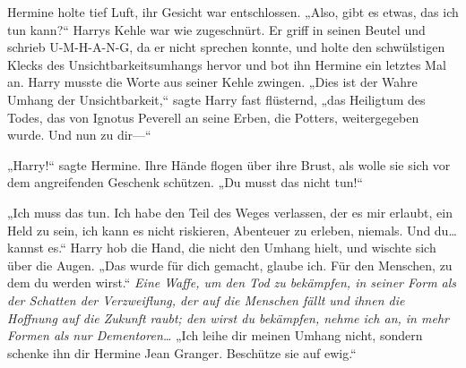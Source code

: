 Hermine holte tief Luft, ihr Gesicht war entschlossen.
„Also, gibt es etwas, das ich tun kann?“
Harrys Kehle war wie zugeschnürt. Er griff in seinen Beutel und schrieb U-M-H-A-N-G, da er nicht sprechen konnte, und holte den schwülstigen Klecks des Unsichtbarkeitsumhangs hervor und bot ihn Hermine ein letztes Mal an. Harry musste die Worte aus seiner Kehle zwingen.
„Dies ist der Wahre Umhang der Unsichtbarkeit,“ sagte Harry fast flüsternd, „das Heiligtum des Todes, das von Ignotus Peverell an seine Erben, die Potters, weitergegeben wurde. Und nun zu dir—“

„Harry!“ sagte Hermine. Ihre Hände flogen über ihre Brust, als wolle sie sich vor dem angreifenden Geschenk schützen.
„Du musst das nicht tun!“

„Ich muss das tun. Ich habe den Teil des Weges verlassen, der es mir erlaubt, ein Held zu sein, ich kann es nicht riskieren, Abenteuer zu erleben, niemals. Und du…kannst es.“ Harry hob die Hand, die nicht den Umhang hielt, und wischte sich über die Augen. „Das wurde für dich gemacht, glaube ich. Für den Menschen, zu dem du werden wirst.“
\emph{Eine Waffe, um den Tod zu bekämpfen, in seiner Form als der Schatten der Verzweiflung, der auf die Menschen fällt und ihnen die Hoffnung auf die Zukunft raubt; den wirst du bekämpfen, nehme ich an, in mehr Formen als nur Dementoren…}
„Ich leihe dir meinen Umhang nicht, sondern schenke ihn dir Hermine Jean Granger. Beschütze sie auf ewig.“

